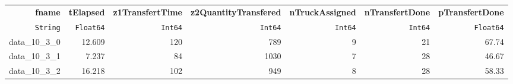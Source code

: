 \begin{tabular}{rrrrrrr}
  \hline
  \textbf{fname} & \textbf{tElapsed} & \textbf{z1TransfertTime} & \textbf{z2QuantityTransfered} & \textbf{nTruckAssigned} & \textbf{nTransfertDone} & \textbf{pTransfertDone} \\
  \texttt{String} & \texttt{Float64} & \texttt{Int64} & \texttt{Int64} & \texttt{Int64} & \texttt{Int64} & \texttt{Float64} \\\hline
  data\_10\_3\_0 & 12.609 & 120 & 789 & 9 & 21 & 67.74 \\
  data\_10\_3\_1 & 7.237 & 84 & 1030 & 7 & 28 & 46.67 \\
  data\_10\_3\_2 & 16.218 & 102 & 949 & 8 & 28 & 58.33 \\\hline
\end{tabular}
